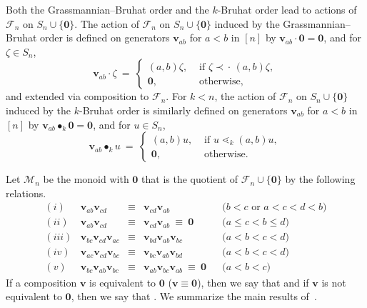 \documentclass[11pt]{article}
\theoremstyle{definition}
\numberwithin{equation}{section}
\newcommand{\calF}{{\mathcal F}}
\newcommand{\calM}{{\mathcal M}}
\newcommand{\qv}{{\mathbf v}}
\newcommand{\bzero}{{\mathbf 0}}
\newcommand{\precdot}{{\prec\!\!\!\cdot\,}}
\DeclareMathOperator{\kactionop}{{\scriptstyle \bullet}}
\newcommand{\kaction}[1][k]{\kactionop_{#1}}
\newcommand{\defcolor}[1]{{\color{RoyalBlue}#1}}
\newcommand{\demph}[1]{\defcolor{{\sl #1}}}
\begin{document}
Both the Grassmannian--Bruhat order and the $k$-Bruhat order lead to actions of~$\calF_n$ on $S_n\cup\{\bzero\}$.
The \defcolor{action of $\calF_n$ on $S_n\cup\{\bzero\}$ induced by the
Grassmannian--Bruhat order} is defined on generators $\qv_{ab}$ for $a<b$ in $[n]$ by $\qv_{ab}\cdot\bzero=\bzero$, and for
$\zeta\in S_n$, 
\begin{equation*}
   \qv_{ab} \cdot \zeta\ =\ \begin{cases}
            (a,b) \zeta, & \text{ if }\zeta\precdot (a,b)\zeta,\\
            \bzero,& \text{ otherwise,}
       \end{cases}
\end{equation*}
and extended via composition to $\calF_n$.
For $k< n$, the \defcolor{action of $\calF_n$ on
$S_n\cup\{\bzero\}$ induced by the $k$-Bruhat order} is similarly defined  on generators $\qv_{ab}$ for
$a<b$ in $[n]$ by $\qv_{ab}\kaction\bzero=\bzero$, and for $u\in S_n$,
\begin{equation*}
   \qv_{ab}\kaction u\ =\ \begin{cases}
            (a,b) u, & \text{ if }u \lessdot_k (a,b)u,\\
            \bzero,& \text{ otherwise.}
       \end{cases}
\end{equation*}

Let \defcolor{$\calM_n$} be the monoid with $\bzero$ that is the quotient of $\calF_n\cup\{\bzero\}$ by the
following relations.
\begin{equation}
    \label{Eq:monoid-relations}
    \begin{array}{rrclll}
        (i)   & \qv_{ab}\qv_{cd}           & \equiv & \qv_{cd}\qv_{ab}                     &  & \text{($b<c$ or $a<c<d<b$)} \\ [0.5ex]
        (ii)  & \qv_{ab}\qv_{cd}           & \equiv & \qv_{cd}\qv_{ab}\ \equiv\ \bzero     &  & \text{($a\leq c<b\leq d$)}  \\ [0.5ex]
        (iii) & \qv_{bc}\qv_{cd}\qv_{ac} & \equiv & \qv_{bd}\qv_{ab}\qv_{bc}                 &  & \text{($a<b<c<d$)}          \\ [0.5ex]
        (iv)  & \qv_{ac}\qv_{cd}\qv_{bc} & \equiv & \qv_{bc}\qv_{ab}\qv_{bd}                 &  & \text{($a<b<c<d$)}          \\ [0.5ex]
        (v)   & \qv_{bc}\qv_{ab}\qv_{bc} & \equiv & \qv_{ab}\qv_{bc}\qv_{ab}\ \equiv\ \bzero &  & \text{($a<b<c$)}
    \end{array}
\end{equation}
If a composition  $\qv$ is equivalent to $\bzero$ ($\qv\equiv\bzero$), then we say that \demph{$\qv$ is zero} and
if $\qv$ is not equivalent to $\bzero$, then we say that \demph{$\qv$ is nonzero}.
We summarize the main results of~\cite{BS-Monoid}.
\end{document}
